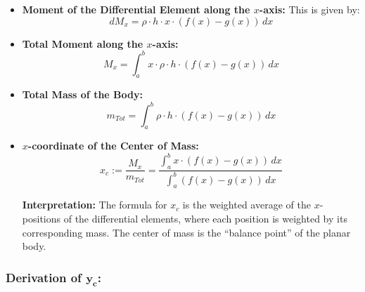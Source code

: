 \begin{itemize}

\item \textbf{Moment of the Differential Element along the $x$-axis:} This is given by:
\[ dM_x = \rho \cdot h \cdot x \cdot  (f(x) - g(x)) \,  dx \]

\item \textbf{Total Moment along the $x$-axis:} 
\[ M_x = \int_{a}^{b}  x \cdot \rho \cdot h \cdot (f(x) - g(x)) \,  dx \]

\item \textbf{Total Mass of the Body:}
\[ m_{Tot} = \int_{a}^{b} \rho \cdot h \cdot(f(x) - g(x))  \, dx \]

\item \textbf{$x$-coordinate of the Center of Mass:}
\[ x_c := \frac{M_x}{m_{Tot} } = \frac{\int_{a}^{b} x \cdot (f(x) - g(x)) \, dx}{\int_{a}^{b} (f(x) - g(x)) \, dx} \]

\textbf{Interpretation:} The formula for \( x_c \) is the weighted average of the $x$-positions of the differential elements, where each position is weighted by its corresponding mass. The center of mass is the ``balance point'' of the planar body.

\end{itemize}

\subsubsection{Derivation of \( \bm{y_c }\):}

